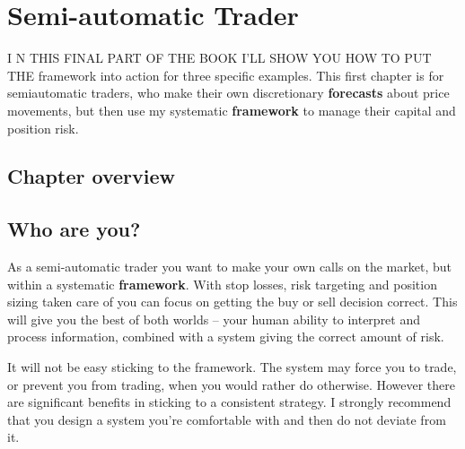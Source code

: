 \chapter{Semi-automatic Trader}

I N THIS FINAL PART OF THE BOOK I'LL SHOW YOU HOW TO PUT THE framework into action for three specific examples. This first chapter is for semiautomatic traders, who make their own discretionary \textbf{forecasts} about price movements, but then use my systematic \textbf{framework} to manage their capital and position risk.

\section*{Chapter overview}  {}

\begin{chapteroverviewtable}
\end{chapteroverviewtable}

\section*{Who are you?}  {}

As a semi-automatic trader you want to make your own calls on the market, but within a systematic \textbf{framework}. With stop losses, risk targeting and position sizing taken care of you can focus on getting the buy or sell decision correct. This will give you the best of both worlds -- your human ability to interpret and process information, combined with a system giving the correct amount of risk.

It will not be easy sticking to the framework. The system may force you to trade, or prevent you from trading, when you would rather do otherwise. However there are significant benefits in sticking to a consistent strategy. I strongly recommend that you design a system you're comfortable with and then do not deviate from it.

